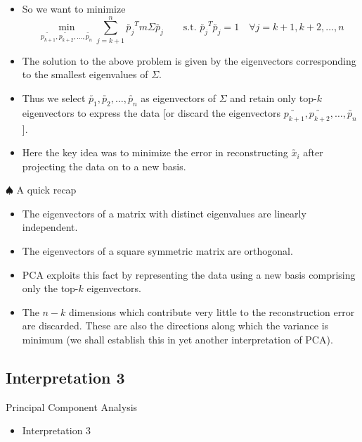 \documentclass[10pt, aspectratio=169]{beamer}
\begin{document}
\begin{frame}
\begin{itemize}
\item<1-> So we want to minimize
\[
\min_{\utilde{p_{k+1}}, \utilde{p_{k+2}}, \ldots, \utilde{p_n}} \sum_{j=k+1}^{n} \utilde{p_j}^T m \Sigma \utilde{p_j}
\qquad \text{s.t. } \utilde{p_j}^T \utilde{p_j} = 1 \quad \forall j = k+1, k+2, \ldots, n
\]

\item<2-> The solution to the above problem is given by the eigenvectors corresponding to the smallest eigenvalues of $\Sigma$.

\item<3-> Thus we select $\utilde{p_1}, \utilde{p_2}, \ldots, \utilde{p_n}$ as eigenvectors of $\Sigma$ and retain only top-$k$ eigenvectors to express the data [or discard the eigenvectors $\utilde{p_{k+1}}, \utilde{p_{k+2}}, \ldots, \utilde{p_n}$].

\item<4-> Here the key idea was to minimize the error in reconstructing $\utilde{x_i}$ after projecting the data on to a new basis.
\end{itemize}
\end{frame}

\begin{frame}
\begin{block}{$\spadesuit$ A quick recap}
\begin{itemize}
\item<1-> The eigenvectors of a matrix with distinct eigenvalues are linearly independent.
\item<2-> The eigenvectors of a square symmetric matrix are orthogonal.
\item<3-> PCA exploits this fact by representing the data using a new basis comprising only the top-$k$ eigenvectors.
\item<4-> The $n - k$ dimensions which contribute very little to the reconstruction error are discarded. These are also the directions along which the variance is minimum (we shall establish this in yet another interpretation of PCA).
\end{itemize}
\end{block}
\end{frame}

\subsection{Interpretation 3}
\begin{frame}{Principal Component Analysis}
\begin{itemize}
\item Interpretation 3
\end{itemize}
\end{frame}
\end{document}
